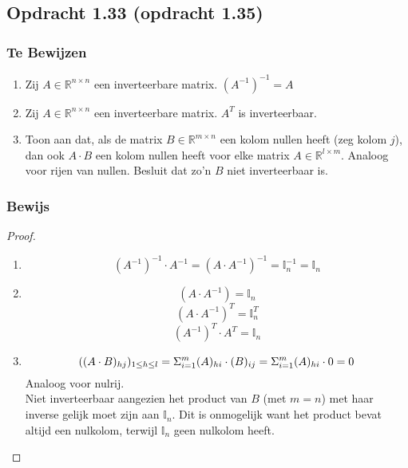 \documentclass[lineaire_algebra_oplossingen.tex]{subfiles}
\begin{document}
\subsection{Opdracht 1.33 (opdracht 1.35) }
\label{1.33}

\subsubsection*{Te Bewijzen}
\begin{enumerate}
\item
Zij $A \in \mathbb{R}^{n\times n}$ een inverteerbare matrix.
$(A^{-1})^{-1} = A$

\item
Zij $A \in \mathbb{R}^{n\times n}$ een inverteerbare matrix.
$A^T$ is inverteerbaar.

\item
Toon aan dat, als de matrix $B \in \mathbb{R}^{m\times n}$ een kolom nullen heeft (zeg kolom $j$), dan ook $A\cdot B$ een kolom nullen heeft voor elke matrix $A \in \mathbb{R}^{l\times m}$.
Analoog voor rijen van nullen.
Besluit dat zo'n $B$ niet inverteerbaar is.
\end{enumerate}

\subsubsection*{Bewijs}
\begin{proof}
\hfill
\begin{enumerate}
\item
\[
(A^{-1})^{-1}\cdot A^{-1} = (A \cdot A^{-1})^{-1} = \mathbb{I}_n^{-1} = \mathbb{I}_n
\]

\item
\[
(A\cdot A^{-1}) = \mathbb{I}_n
\]
\[
(A\cdot A^{-1})^T = \mathbb{I}_n^T
\]
\[
(A^{-1})^T \cdot A^T= \mathbb{I}_n
\]

\item
\[
\Large( (A\cdot B)_{hj} \Large)_{1 \leq h \leq l} = \Sigma_{i=1}^{m} (A)_{hi} \cdot (B)_{ij} = \Sigma_{i=1}^{m} (A)_{hi} \cdot 0 = 0
\]
\centering
Analoog voor nulrij.\\
Niet inverteerbaar aangezien het product van $B$ (met $m=n$) met haar inverse gelijk moet zijn aan $\mathbb{I}_n$. Dit is onmogelijk want het product bevat altijd een nulkolom, terwijl $\mathbb{I}_n$ geen nulkolom heeft.
\end{enumerate}
\end{proof}
\end{document}
